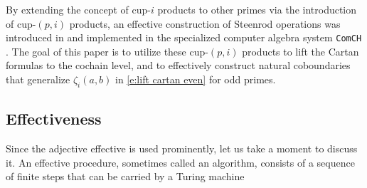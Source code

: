 By extending the concept of cup-$i$ products to other primes via the introduction of cup-$(p,i)$ products, an effective construction of Steenrod operations was introduced in \cite{medina2021may_st} and implemented in the specialized computer algebra system \texttt{ComCH} \cite{medina2021comch}.
The goal of this paper is to utilize these cup-$(p,i)$ products to lift the Cartan formulas to the cochain level, and to effectively construct natural coboundaries that generalize $\zeta_i(a,b)$ in \cref{e:lift cartan even} for odd primes.

\subsection*{Effectiveness}

Since the adjective effective is used prominently, let us take a moment to discuss it.
\TBW
An effective procedure, sometimes called an algorithm, consists of a sequence of finite steps that can be carried by a Turing machine